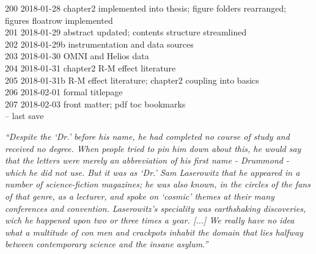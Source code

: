 \begin{titlepage}
\begin{footnotesize}
200	2018-01-28	chapter2 implemented into thesis; figure folders rearranged; figures floatrow implemented\\
201	2018-01-29	abstract updated; contents structure streamlined\\
202	2018-01-29b	instrumentation and data sources\\
203	2018-01-30	OMNI and Helios data\\
204	2018-01-31	chapter2 R-M effect literature\\
205	2018-01-31b	R-M effect literature; chapter2 coupling into basics\\
206	2018-02-01	formal titlepage\\
207	2018-02-03	front matter; pdf toc bookmarks\\
\vspace{\baselineskip}
\ISOToday{} \thistime{} -- last save
\end{footnotesize}

\end{titlepage}

\clearpage


\vspace*{\fill}


\noindent \textit{``Despite the `Dr.' before his name, he had completed no course of study and received no degree. When people tried to pin him down about this, he would say that the letters were merely an abbreviation of his first name - Drummond - which he did not use. But it was as `Dr.' Sam Laserowitz that he appeared in a number of science-fiction magazines; he was also known, in the circles of the fans of that genre, as a lecturer, and spoke on `cosmic' themes at their many conferences and convention. Laserowitz's speciality was earthshaking discoveries, wich he happened upon two or three times a year. [...] We really have no idea what a multitude of con men and crackpots inhabit the domain that lies halfway between contemporary science and the insane asylum.''}
\vspace{\baselineskip}

